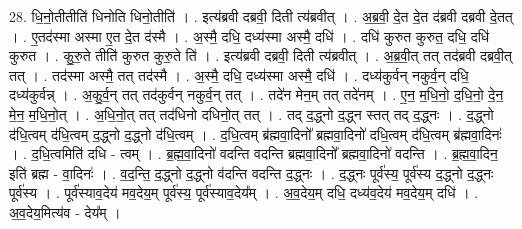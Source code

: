 \documentclass[17pt]{extarticle}
\begin{document}
28. धि॒नो॒तीतीति॑ धिनोति धिनो॒तीति॑ । . इत्य॑ब्रवी दब्रवी॒ दिती त्य॑ब्रवीत् । . अ॒ब्र॒वी॒ दे॒त दे॒त द॑ब्रवी दब्रवी दे॒तत् । . ए॒तद॑स्मा अस्मा ए॒त दे॒त द॑स्मै । . अ॒स्मै॒ दधि॒ दध्य॑स्मा अस्मै॒ दधि॑ । . दधि॑ कुरुत कुरुत॒ दधि॒ दधि॑ कुरुत । . कु॒रु॒ते तीति॑ कुरुत कुरु॒ते ति॑ । . इत्य॑ब्रवी दब्रवी॒ दिती त्य॑ब्रवीत् । . अ॒ब्र॒वी॒त् तत् तद॑ब्रवी दब्रवी॒त् तत् । . तद॑स्मा अस्मै॒ तत् तद॑स्मै । . अ॒स्मै॒ दधि॒ दध्य॑स्मा अस्मै॒ दधि॑ । . दध्य॑कुर्वन् नकुर्व॒न् दधि॒ दध्य॑कुर्वन्न् । . अ॒कु॒र्व॒न् तत् तद॑कुर्वन् नकुर्व॒न् तत् । . तदे॑न मेन॒म् तत् तदे॑नम् । . ए॒न॒ म॒धि॒नो॒ द॒धि॒नो॒ दे॒न॒ मे॒न॒ म॒धि॒नो॒त् । . अ॒धि॒नो॒त् तत् तद॑धिनो दधिनो॒त् तत् । . तद् द॒द्ध्नो द॒द्ध्न स्तत् तद् द॒द्ध्नः । . द॒द्ध्नो द॑धि॒त्वम् द॑धि॒त्वम् द॒द्ध्नो द॒द्ध्नो द॑धि॒त्वम् । . द॒धि॒त्वम् ब्र॑ह्मवा॒दिनो᳚ ब्रह्मवा॒दिनो॑ दधि॒त्वम् द॑धि॒त्वम् ब्र॑ह्मवा॒दिनः॑ । . द॒धि॒त्वमिति॑ दधि - त्वम् । . ब्र॒ह्म॒वा॒दिनो॑ वदन्ति वदन्ति ब्रह्मवा॒दिनो᳚ ब्रह्मवा॒दिनो॑ वदन्ति । . ब्र॒ह्म॒वा॒दिन॒ इति॑ ब्रह्म - वा॒दिनः॑ । . व॒द॒न्ति॒ द॒द्ध्नो द॒द्ध्नो व॑दन्ति वदन्ति द॒द्ध्नः । . द॒द्ध्नः पूर्व॑स्य॒ पूर्व॑स्य द॒द्ध्नो द॒द्ध्नः पूर्व॑स्य । . पूर्व॑स्याव॒देय॑ मव॒देय॒म् पूर्व॑स्य॒ पूर्व॑स्याव॒देय᳚म् । . अ॒व॒देय॒म् दधि॒ दध्य॑व॒देय॑ मव॒देय॒म् दधि॑ । . अ॒व॒देय॒मित्य॑व - देय᳚म् । \newline
\end{document}
